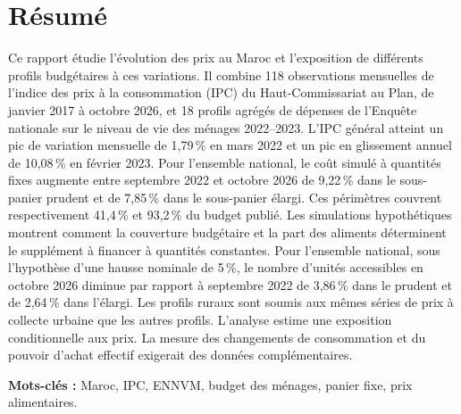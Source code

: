 \documentclass[11pt,a4paper]{report}
\renewcommand{\bibname}{Références bibliographiques}
\begin{document}
\hypersetup{pageanchor=false}

\hypersetup{pageanchor=true}
\chapter*{Résumé}
Ce rapport étudie l'évolution des prix au Maroc et l'exposition de différents profils budgétaires à ces variations. Il combine 118 observations mensuelles de l'indice des prix à la consommation (IPC) du Haut-Commissariat au Plan, de janvier 2017 à octobre 2026, et 18 profils agrégés de dépenses de l'Enquête nationale sur le niveau de vie des ménages 2022--2023. L'IPC général atteint un pic de variation mensuelle de 1,79\,\% en mars 2022 et un pic en glissement annuel de 10,08\,\% en février 2023. Pour l'ensemble national, le coût simulé à quantités fixes augmente entre septembre 2022 et octobre 2026 de 9,22\,\% dans le sous-panier prudent et de 7,85\,\% dans le sous-panier élargi. Ces périmètres couvrent respectivement 41,4\,\% et 93,2\,\% du budget publié. Les simulations hypothétiques montrent comment la couverture budgétaire et la part des aliments déterminent le supplément à financer à quantités constantes. Pour l'ensemble national, sous l'hypothèse d'une hausse nominale de 5\,\%, le nombre d'unités accessibles en octobre 2026 diminue par rapport à septembre 2022 de 3,86\,\% dans le prudent et de 2,64\,\% dans l'élargi. Les profils ruraux sont soumis aux mêmes séries de prix à collecte urbaine que les autres profils. L'analyse estime une exposition conditionnelle aux prix. La mesure des changements de consommation et du pouvoir d'achat effectif exigerait des données complémentaires.

\noindent\textbf{Mots-clés :} Maroc, IPC, ENNVM, budget des ménages, panier fixe, prix alimentaires.
\tableofcontents
\clearpage
{}







\clearpage


\appendix

\clearpage
{}
{}
\renewcommand{\bibname}{Références bibliographiques}


\end{document}

